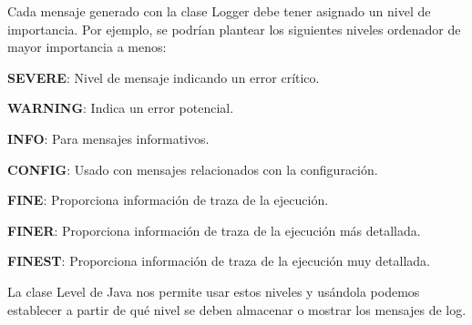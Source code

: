 Cada mensaje generado con la clase Logger debe tener asignado un nivel de importancia. Por ejemplo, se podrían plantear los siguientes niveles ordenador de mayor importancia a menos\cite{Level_class_info}:
\begin{description}
\item \textbf{SEVERE}: Nivel de mensaje indicando un error crítico.
\item \textbf{WARNING}: Indica un error potencial.
\item \textbf{INFO}: Para mensajes informativos.
\item \textbf{CONFIG}: Usado con mensajes relacionados con la configuración.
\item \textbf{FINE}: Proporciona información de traza de la ejecución.
\item \textbf{FINER}: Proporciona información de traza de la ejecución más detallada.
\item \textbf{FINEST}: Proporciona información de traza de la ejecución muy detallada.

La clase Level de Java nos permite usar estos niveles y usándola podemos establecer a partir de qué nivel se deben almacenar o mostrar los mensajes de log.

\end{description}

